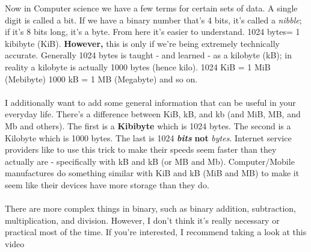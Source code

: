 \documentclass[12pt,a4paper]{book}
\begin{document}
			Now in Computer science we have a few terms for certain sets of data. A single digit is called a bit. If we have a binary number that's 4 bits, it's called a \textit{nibble}; if it's 8 bits long, it's a byte. From here it's easier to understand. 1024 bytes= 1 kibibyte (KiB). \textbf{However,} this is only if we're being extremely technically accurate. Generally 1024 bytes is taught - and learned - as a kilobyte (kB); in reality a kilobyte is actually 1000 bytes (hence kilo). 1024 KiB = 1 MiB (Mebibyte) 1000 kB = 1 MB (Megabyte) and so on.
				\\\\
			I additionally want to add some general information that can be useful in your everyday life. There's a difference between KiB, kB, and kb (and MiB, MB, and Mb and others). The first is a \textbf{Kibibyte} which is 1024 bytes. The second is a Kilobyte which is 1000 bytes. The last is 1024 \textit{\textbf{bits}} \textbf{not} \textit{bytes}. Internet service providers like to use this trick to make their speeds seem faster than they actually are - specifically with kB and kB (or MB and Mb). Computer/Mobile manufactures do something similar with KiB and kB (MiB and MB) to make it seem like their devices have more storage than they do. 
				\\\\
				There are more complex things in binary, such as binary addition, subtraction, multiplication, and division. However, I don't think it's really necessary or practical most of the time. If you're interested, I recommend taking a look at this video 
			
\end{document}
